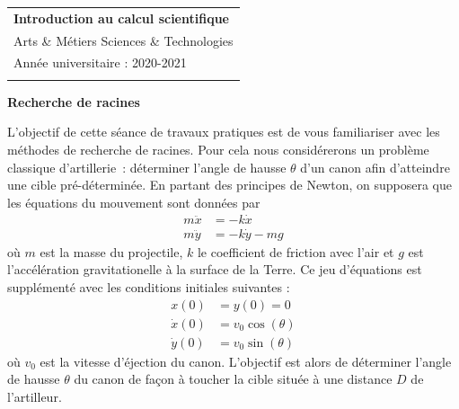 \documentclass[a4paper,12pt]{article} %
\begin{document}



\thispagestyle{empty} %

\begin{tabular}{p{15.5cm}} %
{\large \bf Introduction au calcul scientifique} \\
Arts \& Métiers Sciences \& Technologies \\
Année universitaire : 2020-2021 \\
\hline %
\\
\end{tabular} %

\vspace*{0.3cm} %

\begin{center} %
	{\Large \bf Recherche de racines} %
	\vspace{2mm} %
\end{center}  

\vspace{0.4cm}


L'objectif de cette séance de travaux pratiques est de vous familiariser avec les méthodes de recherche de racines.
Pour cela nous considérerons un problème classique d'artillerie~: déterminer l'angle de hausse $\theta$ d'un canon afin d'atteindre une cible pré-déterminée.
En partant des principes de Newton, on supposera que les équations du mouvement sont données par
%
\[
\begin{aligned}
  m \ddot{x} & = -k \dot{x} \\
  m \ddot{y} & = -k \dot{y} - mg
\end{aligned}
\]
%
où $m$ est la masse du projectile, $k$ le coefficient de friction avec l'air et $g$ est l'accélération gravitationelle à la surface de la Terre.
Ce jeu d'équations est supplémenté avec les conditions initiales suivantes :
%
\[
\begin{aligned}
  x(0) & = y(0) = 0 \\
  \dot{x}(0) & = v_0 \cos(\theta) \\
  \dot{y}(0) & = v_0 \sin(\theta)
\end{aligned}
\]
%
où $v_0$ est la vitesse d'éjection du canon.
L'objectif est alors de déterminer l'angle de hausse $\theta$ du canon de façon à toucher la cible située à une distance $D$ de l'artilleur.
\end{document}
